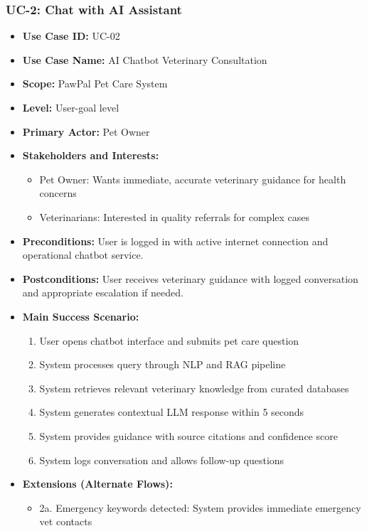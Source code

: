 \subsubsection*{UC-2: Chat with AI Assistant}
\begin{itemize}
    \item \textbf{Use Case ID:} UC-02
    \item \textbf{Use Case Name:} AI Chatbot Veterinary Consultation
    \item \textbf{Scope:} PawPal Pet Care System
    \item \textbf{Level:} User-goal level
    \item \textbf{Primary Actor:} Pet Owner
    \item \textbf{Stakeholders and Interests:}
    \begin{itemize}
        \item Pet Owner: Wants immediate, accurate veterinary guidance for health concerns
        \item Veterinarians: Interested in quality referrals for complex cases
    \end{itemize}
    \item \textbf{Preconditions:} User is logged in with active internet connection and operational chatbot service.
    \item \textbf{Postconditions:} User receives veterinary guidance with logged conversation and appropriate escalation if needed.
    \item \textbf{Main Success Scenario:}
    \begin{enumerate}
        \item User opens chatbot interface and submits pet care question
        \item System processes query through NLP and RAG pipeline
        \item System retrieves relevant veterinary knowledge from curated databases
        \item System generates contextual LLM response within 5 seconds
        \item System provides guidance with source citations and confidence score
        \item System logs conversation and allows follow-up questions
    \end{enumerate}
    \item \textbf{Extensions (Alternate Flows):}
    \begin{itemize}
        \item 2a. Emergency keywords detected: System provides immediate emergency vet contacts

\end{itemize}
\end{itemize}
